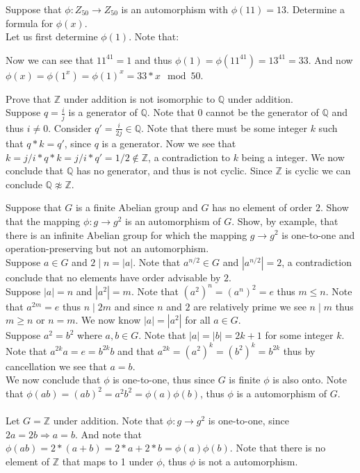 \documentclass[12pt]{article}
\makeatletter
\theoremstyle{homework}
\newenvironment{exercise}[1]
{\def\@currentlabel{#1}\exercisecore}
{\endexercisecore}
\makeatother
\begin{document}
\begin{exercise}{6.30}
Suppose that $\phi: Z_{50} \rightarrow Z_{50}$ is an automorphism with $\phi(11)= 13$.  Determine a formula for $\phi(x)$.\\
Let us first determine $\phi(1)$.  Note that:

Now we can see that $11^{41}=1$ and thus $\phi(1)=\phi(11^{41})=13^{41}=33$.  And now $\phi(x)=\phi(1^x)=\phi(1)^x=33*x\mod 50$.
\end{exercise}

\begin{exercise}{6.37}
Prove that $\mathbb{Z}$ under addition is not isomorphic to $\mathbb{Q}$ under addition.\\
Suppose $q=\frac{i}{j}$ is a generator of $\mathbb{Q}$.  Note that $0$ cannot be the generator of $\mathbb{Q}$ and thus $i\neq 0$.  Consider $q'=\frac{i}{2j}\in \mathbb{Q}$.  Note that there must be some integer $k$ such that $q*k=q'$, since $q$ is a generator.  Now we see that $k=j/i*q*k=j/i*q'=1/2\not\in \mathbb{Z}$, a contradiction to $k$ being a integer.  We now conclude that $\mathbb{Q}$ has no generator, and thus is not cyclic.  Since $\mathbb{Z}$ is cyclic we can conclude $\mathbb{Q}\not\approx \mathbb{Z}$.
\end{exercise}

\begin{exercise}{6.42}
Suppose that $G$ is a finite Abelian group and $G$ has no element of order $2$. Show that the mapping $\phi:g \rightarrow g^2$ is an automorphism of $G$. Show, by example, that there is an infinite Abelian group for which the mapping $g \rightarrow g^2$ is one-to-one and operation-preserving but not an automorphism.\\
Suppose $a\in G$ and $2\mid n=|a|$.  Note that $a^{n/2}\in G$ and $|a^{n/2}|=2$, a contradiction conclude that no elements have order advisable by $2$.\\
Suppose $|a|=n$ and $|a^2|=m$.  Note that $(a^2)^n=(a^n)^2=e$ thus $m\leq n$.  Note that $a^{2m}=e$  thus $n\mid 2m$ and since $n$ and $2$ are relatively prime we see $n\mid m$ thus $m\geq n$ or $n=m$.  We now know $|a|=|a^2|$ for all $a\in G$.\\
Suppose $a^2=b^2$ where $a,b\in G$.  Note that $|a|=|b|=2k+1$ for some integer $k$.  Note that $a^{2k}a=e=b^{2k}b$ and that $a^{2k}=(a^2)^k=(b^2)^k=b^{2k}$ thus by cancellation we see that $a=b$.\\
We now conclude that $\phi$ is one-to-one, thus since $G$ is finite $\phi$ is also onto.  Note that $\phi(ab)=(ab)^2=a^2b^2=\phi(a)\phi(b)$, thus $\phi$ is a automorphism of $G$.\\\\
Let $G=\mathbb{Z}$ under addition.  Note that $\phi:g \rightarrow g^2$ is one-to-one, since $2a=2b\Rightarrow a=b$.  And note that $\phi(ab)=2*(a+b)=2*a+2*b=\phi(a)\phi(b)$.  Note that there is no element of $\mathbb{Z}$ that maps to 1 under $\phi$, thus $\phi$ is not a automorphism.
\end{exercise}
\end{document}
